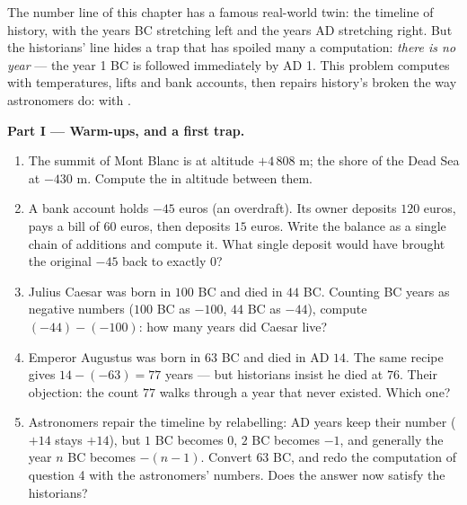 \begin{problem}
\label{pb:g7:negatives:1}
The number line of this chapter has a famous real-world twin: the
timeline of history, with the years BC stretching left and the
years AD stretching right. But the historians' line hides a trap
that has spoiled many a computation: \emph{there is no year }
--- the year 1 BC is followed immediately by AD 1. This problem
computes with temperatures, lifts and bank accounts, then repairs
history's broken  the way astronomers do: with .

\medskip
\noindent\textbf{Part I --- Warm-ups, and a first trap.}
\begin{enumerate}
  \item The summit of Mont Blanc is at altitude $+4\,808$ m; the
        shore of the Dead Sea at $-430$ m. Compute the 
        in altitude between them.
  \item A bank account holds $-45$ euros (an overdraft). Its
        owner deposits $120$ euros, pays a bill of $60$ euros,
        then deposits $15$ euros. Write the balance as a single
        chain of additions and compute it. What single deposit
        would have brought the original $-45$ back to exactly
        $0$?
  \item Julius Caesar was born in $100$ BC and died in $44$ BC.
        Counting BC years as negative numbers ($100$ BC as
        $-100$, $44$ BC as $-44$), compute $(-44) - (-100)$: how
        many years did Caesar live?
  \item Emperor Augustus was born in $63$ BC and died in AD
        $14$. The same recipe gives $14 - (-63) = 77$ years ---
        but historians insist he died at $76$. Their objection:
        the count $77$ walks through a year that never existed.
        Which one?
  \item Astronomers repair the timeline by relabelling: AD years
        keep their number ($+14$ stays $+14$), but $1$ BC
        becomes $0$, $2$ BC becomes $-1$, and generally the year
        $n$ BC becomes $-(n - 1)$. Convert $63$ BC, and redo the
        computation of question 4 with the astronomers' numbers.
        Does the answer now satisfy the historians?
\end{enumerate}


\end{problem}
